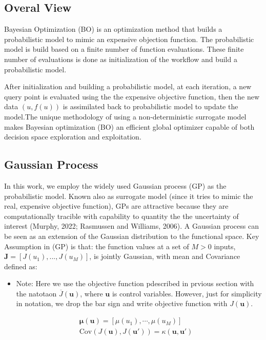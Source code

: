 \documentclass[]{elsarticle} %
\providecommand{\tightlist}{%
  \setlength{\itemsep}{0pt}\setlength{\parskip}{0pt}}
\begin{document}
\hypertarget{overal-view}{%
\subsection{Overal View}\label{overal-view}}

Bayesian Optimization (BO) is an optimization method that builds a probabilistic model to mimic an expensive objection function. The probabilistic model is build based on a finite number of function evaluations. These finite number of evaluations is done as initialization of the workflow and build a probabilistic model.

After initialization and building a probabilistic model, at each iteration, a new query point is evaluated using the the expensive objective function, then the new data \((u,f(u))\) is assimilated back to probabilistic model to update the model.The unique methodology of using a non-deterministic surrogate model makes Bayesian optimization (BO) an efficient global optimizer capable of both decision space exploration and exploitation.

\hypertarget{gaussian-process}{%
\subsection{Gaussian Process}\label{gaussian-process}}

In this work, we employ the widely used Gaussian process (GP) as the probabilistic model. Known also as surrogate model (since it tries to mimic the real, expensive objective function), GPs are attractive because they are computationally tracible with capability to quantity the the uncertainty of interest (Murphy, 2022; Rasmussen and Williams, 2006). A Gaussian process can be seen as an extension of the Gaussian distribution to the functional space. Key Assumption in (GP) is that: the function values at a set of \(M > 0\) inputs, \(\mathbf{J} = [J({u_1}), ...,J(u_M)]\), is jointly Gaussian, with mean and Covariance defined as:

\begin{itemize}
\tightlist
\item
  Note: Here we use the objective function pdescribed in prvious section with the natotaon \(\overline{J}(\mathbf{u})\), where \(\mathbf{u}\) is control variables. However, just for simplicity in notation, we drop the bar sign and write objective function with \(J(\mathbf{u})\).
\end{itemize}

\begin{equation}
  \begin{split}
& \mathbf{\mu(u)} = [\mu(u_1),\cdots,\mu(u_M)] \\
& \text{Cov}(J(\mathbf{u}),J(\mathbf{u'}))= \kappa(\mathbf{u},\mathbf{u'})
  \end{split}
\label{eq:mean_cov}
\end{equation}
\end{document}
